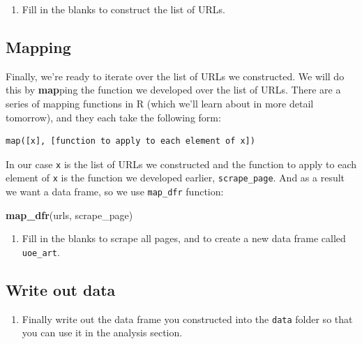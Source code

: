 \documentclass[
]{article}
\newenvironment{Shaded}{\begin{snugshade}}{\end{snugshade}}
\newcommand{\FunctionTok}[1]{\textcolor[rgb]{0.13,0.29,0.53}{\textbf{#1}}}
\newcommand{\NormalTok}[1]{#1}
\providecommand{\tightlist}{%
  \setlength{\itemsep}{0pt}\setlength{\parskip}{0pt}}
\begin{document}
\begin{enumerate}
\def\labelenumi{\arabic{enumi}.}
\setcounter{enumi}{5}
\tightlist
\item
  Fill in the blanks to construct the list of URLs.
\end{enumerate}

\subsection{Mapping}\label{mapping}

Finally, we're ready to iterate over the list of URLs we constructed. We
will do this by \textbf{map}ping the function we developed over the list
of URLs. There are a series of mapping functions in R (which we'll learn
about in more detail tomorrow), and they each take the following form:

\begin{verbatim}
map([x], [function to apply to each element of x])
\end{verbatim}

In our case \texttt{x} is the list of URLs we constructed and the
function to apply to each element of \texttt{x} is the function we
developed earlier, \texttt{scrape\_page}. And as a result we want a data
frame, so we use \texttt{map\_dfr} function:

\begin{Shaded}
\begin{Highlighting}[]
\FunctionTok{map\_dfr}\NormalTok{(urls, scrape\_page)}
\end{Highlighting}
\end{Shaded}

\begin{enumerate}
\def\labelenumi{\arabic{enumi}.}
\setcounter{enumi}{6}
\tightlist
\item
  Fill in the blanks to scrape all pages, and to create a new data frame
  called \texttt{uoe\_art}.
\end{enumerate}

\subsection{Write out data}\label{write-out-data}

\begin{enumerate}
\def\labelenumi{\arabic{enumi}.}
\setcounter{enumi}{7}
\tightlist
\item
  Finally write out the data frame you constructed into the
  \texttt{data} folder so that you can use it in the analysis section.
\end{enumerate}
\end{document}
